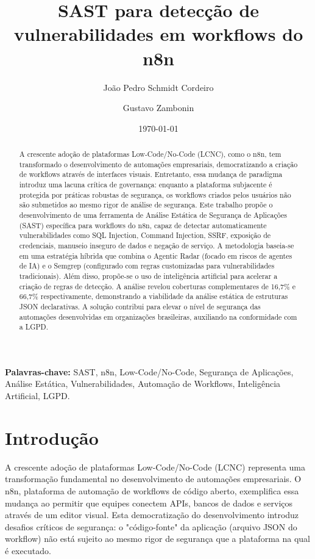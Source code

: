\documentclass[12pt,a4paper]{article}
\title{\textbf{SAST para detecção de vulnerabilidades em workflows do n8n}}
\author{João Pedro Schmidt Cordeiro \and Gustavo Zambonin}
\date{\small \today}
\begin{document}
\maketitle

\begin{abstract}
A crescente adoção de plataformas Low-Code/No-Code (LCNC), como o n8n, tem transformado o desenvolvimento de automações empresariais, democratizando a criação de workflows através de interfaces visuais. Entretanto, essa mudança de paradigma introduz uma lacuna crítica de governança: enquanto a plataforma subjacente é protegida por práticas robustas de segurança, os workflows criados pelos usuários não são submetidos ao mesmo rigor de análise de segurança. Este trabalho propõe o desenvolvimento de uma ferramenta de Análise Estática de Segurança de Aplicações (SAST) específica para workflows do n8n, capaz de detectar automaticamente vulnerabilidades como SQL Injection, Command Injection, SSRF, exposição de credenciais, manuseio inseguro de dados e negação de serviço. A metodologia baseia-se em uma estratégia híbrida que combina o Agentic Radar (focado em riscos de agentes de IA) e o Semgrep (configurado com regras customizadas para vulnerabilidades tradicionais). Além disso, propõe-se o uso de inteligência artificial para acelerar a criação de regras de detecção. A análise revelou coberturas complementares de 16,7\% e 66,7\% respectivamente, demonstrando a viabilidade da análise estática de estruturas JSON declarativas. A solução contribui para elevar o nível de segurança das automações desenvolvidas em organizações brasileiras, auxiliando na conformidade com a LGPD.
\end{abstract}

\textbf{Palavras-chave:} SAST, n8n, Low-Code/No-Code, Segurança de Aplicações, Análise Estática, Vulnerabilidades, Automação de Workflows, Inteligência Artificial, LGPD.

\tableofcontents

\section{Introdução}
\label{sec:introducao}

A crescente adoção de plataformas Low-Code/No-Code (LCNC) representa uma transformação fundamental no desenvolvimento de automações empresariais. O n8n, plataforma de automação de workflows de código aberto, exemplifica essa mudança ao permitir que equipes conectem APIs, bancos de dados e serviços através de um editor visual. Esta democratização do desenvolvimento introduz desafios críticos de segurança: o "código-fonte" da aplicação (arquivo JSON do workflow) não está sujeito ao mesmo rigor de segurança que a plataforma na qual é executado.
\end{document}
